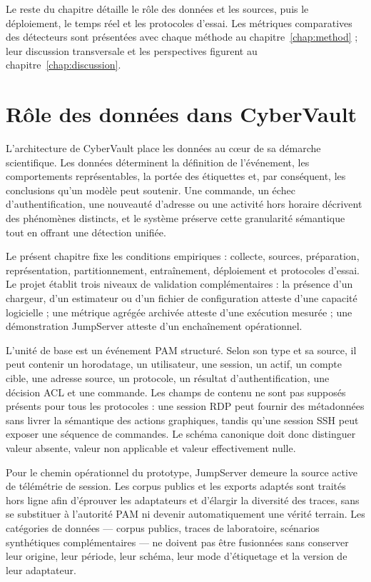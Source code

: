 \documentclass[11pt,a4paper,oneside]{report}
\theoremstyle{definition}
\theoremstyle{plain}
\begin{document}
Le reste du chapitre détaille le rôle des données et les sources, puis le
déploiement, le temps réel et les protocoles d'essai. Les métriques
comparatives des détecteurs sont présentées avec chaque méthode au
chapitre~\ref{chap:method} ; leur discussion transversale et les perspectives
figurent au chapitre~\ref{chap:discussion}.

\section{Rôle des données dans CyberVault}

L'architecture de CyberVault place les données au cœur de sa démarche
scientifique. Les données déterminent la définition de l'événement, les
comportements représentables, la portée des étiquettes et, par conséquent, les
conclusions qu'un modèle peut soutenir. Une commande, un échec
d'authentification, une nouveauté d'adresse ou une activité hors horaire
décrivent des phénomènes distincts, et le système préserve cette granularité
sémantique tout en offrant une détection unifiée.

Le présent chapitre fixe les conditions empiriques : collecte, sources,
préparation, représentation, partitionnement, entraînement, déploiement et
protocoles d'essai. Le projet établit trois niveaux de validation
complémentaires : la présence d'un chargeur, d'un estimateur ou d'un fichier
de configuration atteste d'une capacité logicielle ; une métrique agrégée
archivée atteste d'une exécution mesurée ; une démonstration JumpServer
atteste d'un enchaînement opérationnel.

L'unité de base est un événement PAM structuré. Selon son type et sa source, il
peut contenir un horodatage, un utilisateur, une session, un actif, un compte
cible, une adresse source, un protocole, un résultat d'authentification, une
décision ACL et une commande. Les champs de contenu ne sont pas supposés
présents pour tous les protocoles : une session RDP peut fournir des
métadonnées sans livrer la sémantique des actions graphiques, tandis qu'une
session SSH peut exposer une séquence de commandes. Le schéma canonique doit
donc distinguer valeur absente, valeur non applicable et valeur effectivement
nulle.

Pour le chemin opérationnel du prototype, JumpServer demeure la source active
de télémétrie de session. Les corpus publics et les exports adaptés sont
traités hors ligne afin d'éprouver les adaptateurs et d'élargir la diversité
des traces, sans se substituer à l'autorité PAM ni devenir automatiquement une
vérité terrain. Les catégories de données --- corpus publics, traces de
laboratoire, scénarios synthétiques complémentaires --- ne doivent pas être
fusionnées sans conserver leur origine, leur période, leur schéma, leur mode
d'étiquetage et la version de leur adaptateur.
\end{document}
